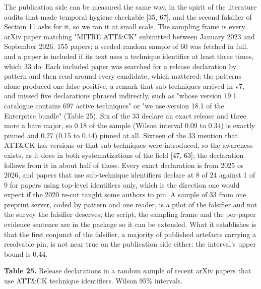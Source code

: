 \documentclass[11pt,a4paper]{article}
\begin{document}
The publication side can be measured the same way, in the spirit of the literature audits that made temporal hygiene checkable [35, 67], and the second falsifier of Section 11 asks for it, so we ran it at small scale. The sampling frame is every arXiv paper matching "MITRE ATT\&CK" submitted between January 2023 and September 2026, 155 papers; a seeded random sample of 60 was fetched in full, and a paper is included if its text uses a technique identifier at least three times, which 33 do. Each included paper was searched for a release declaration by pattern and then read around every candidate, which mattered: the patterns alone produced one false positive, a remark that sub-techniques arrived in v7, and missed five declarations phrased indirectly, such as "whose version 19.1 catalogue contains 697 active techniques" or "we use version 18.1 of the Enterprise bundle" (Table 25). Six of the 33 declare an exact release and three more a bare major, so 0.18 of the sample (Wilson interval 0.09 to 0.34) is exactly pinned and 0.27 (0.15 to 0.44) pinned at all. Sixteen of the 33 mention that ATT\&CK has versions or that sub-techniques were introduced, so the awareness exists, as it does in both systematizations of the field [47, 63]; the declaration follows from it in about half of those. Every exact declaration is from 2025 or 2026, and papers that use sub-technique identifiers declare at 8 of 24 against 1 of 9 for papers using top-level identifiers only, which is the direction one would expect if the 2020 re-cut taught some authors to pin. A sample of 33 from one preprint server, coded by pattern and one reader, is a pilot of the falsifier and not the survey the falsifier deserves; the script, the sampling frame and the per-paper evidence sentence are in the package so it can be extended. What it establishes is that the first conjunct of the falsifier, a majority of published artefacts carrying a resolvable pin, is not near true on the publication side either: the interval's upper bound is 0.44.

\textbf{Table 25.} Release declarations in a random sample of recent arXiv papers that use ATT\&CK technique identifiers. Wilson 95\% intervals.
\end{document}
